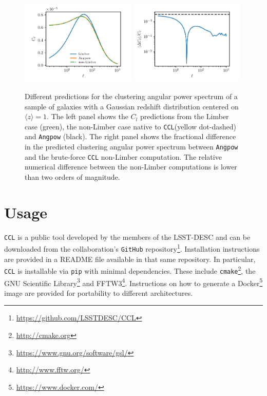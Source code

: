 \documentclass[\docopts]{\docclass}
\newcommand{\ccl}{{\tt CCL}\xspace}
\begin{document}
\begin{figure}[htbp]
\centering
\includegraphics[width=0.49\textwidth]{angpow1}
\includegraphics[width=0.49\textwidth]{angpow3}
\caption{Different predictions for the clustering angular power spectrum of a sample of galaxies with a Gaussian redshift distribution centered on $\langle z \rangle =1$. The left panel shows the $C_l$ predictions from the Limber case (green), the non-Limber case native to \ccl (yellow dot-dashed) and {\tt Angpow} (black). The right panel shows the fractional difference in the predicted clustering angular power spectrum between {\tt Angpow} and the brute-force \ccl non-Limber computation. The relative numerical difference between the non-Limber computations is lower than two orders of magnitude.}
\label{fig:angpow}
\end{figure}

\section{Usage}
\label{sec:usage}

\ccl is a public tool developed by the members of the LSST-DESC and can be downloaded from the collaboration's {\tt GitHub} repository\footnote{\url{https://github.com/LSSTDESC/CCL}}. Installation instructions are provided in a README file available in that same repository. In particular, \ccl is installable via {\tt pip} with minimal dependencies. These include {\tt cmake}\footnote{\url{http://cmake.org}}, the GNU Scientific Library\footnote{\url{https://www.gnu.org/software/gsl/}} and FFTW3\footnote{\url{http://www.fftw.org/}}. Instructions on how to generate a Docker\footnote{\url{https://www.docker.com/}} image are provided for portability to different architectures.
\end{document}
